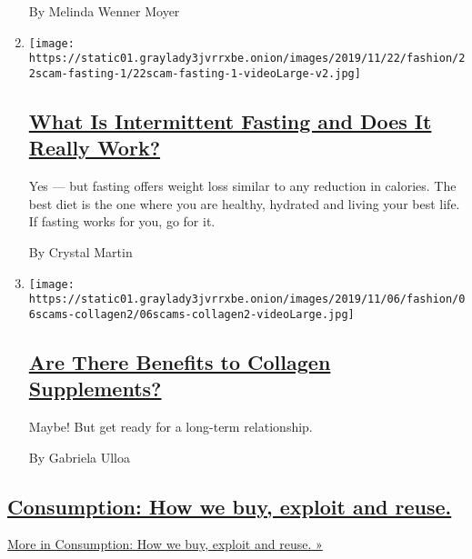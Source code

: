 \begin{enumerate}
  By Melinda Wenner Moyer
\item
  \texttt{[image: https://static01.graylady3jvrrxbe.onion/images/2019/11/22/fashion/22scam-fasting-1/22scam-fasting-1-videoLarge-v2.jpg]}

  \hypertarget{what-is-intermittent-fasting-and-does-it-really-work}{%
  \subsection{\texorpdfstring{\href{/2019/11/23/style/self-care/intermittent-fasting-benefits.html}{What
  Is Intermittent Fasting and Does It Really
  Work?}}{What Is Intermittent Fasting and Does It Really Work?}}\label{what-is-intermittent-fasting-and-does-it-really-work}}

  Yes --- but fasting offers weight loss similar to any reduction in
  calories. The best diet is the one where you are healthy, hydrated and
  living your best life. If fasting works for you, go for it.

  By Crystal Martin
\item
  \texttt{[image: https://static01.graylady3jvrrxbe.onion/images/2019/11/06/fashion/06scams-collagen2/06scams-collagen2-videoLarge.jpg]}

  \hypertarget{are-there-benefits-to-collagen-supplements}{%
  \subsection{\texorpdfstring{\href{/2019/11/09/style/self-care/collagen-benefits.html}{Are
  There Benefits to Collagen
  Supplements?}}{Are There Benefits to Collagen Supplements?}}\label{are-there-benefits-to-collagen-supplements}}

  Maybe! But get ready for a long-term relationship.

  By Gabriela Ulloa
\end{enumerate}

\hypertarget{consumption-how-we-buy-exploit-and-reuse}{%
\subsection{\texorpdfstring{\href{/issue/fashion/2019/12/16/consumption}{Consumption:
How we buy, exploit and
reuse.}}{Consumption: How we buy, exploit and reuse.}}\label{consumption-how-we-buy-exploit-and-reuse}}

\href{/issue/fashion/2019/12/16/consumption}{More in Consumption: How we
buy, exploit and reuse. »}

